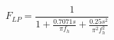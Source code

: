 \begin{equation}
F_{LP} = \frac{1}{1 + \frac{0.7071 s}{\pi f_{h}} + \frac{0.25 s^{2}}{\pi^{2} f_{h}^{2}}}
\end{equation}

